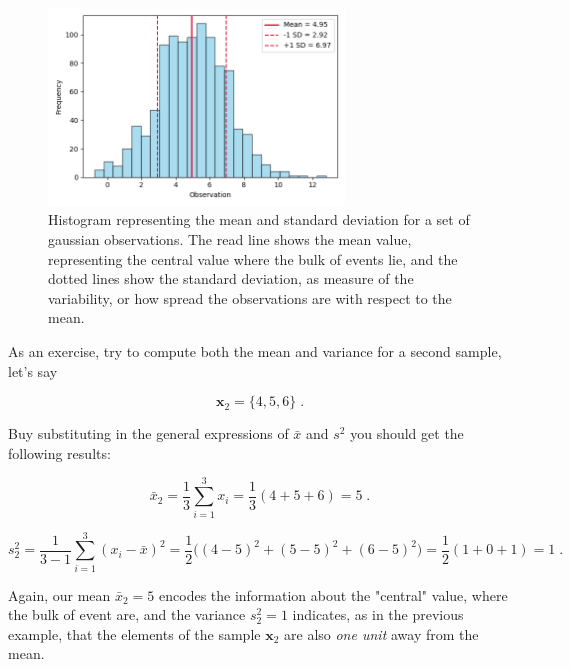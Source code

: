 \documentclass{book}
\begin{document}
\begin{figure}[ht]
    \centering
    \includegraphics[width=0.7\textwidth]{figures/chapter1/normal_hist.png}
    \caption{Histogram representing the mean and standard deviation for a set of gaussian observations. The read line shows the mean value, representing the central value where the bulk of events lie, and the dotted lines show the standard deviation, as measure of the variability, or how spread the observations are with respect to the mean.}
    \label{fig:histogram1}
\end{figure}

As an exercise, try to compute both the mean and variance for a second sample, let's say

\begin{equation}
\textbf{x}_2 = \{4, 5, 6\} \; . \nonumber
\end{equation}

Buy substituting in the general expressions of $\bar{x}$ and $s^2$ you should get the following results: 

\begin{equation}
\bar{x}_2 = \frac{1}{3} \sum_{i = 1}^{3} x_{i} = \frac{1}{3} (4 + 5 + 6) = 5 \; . \nonumber
\end{equation}

\begin{equation}
s^2_2 = \frac{1}{3 - 1} \sum_{i = 1}^{3} (x_{i} - \bar{x})^{2} = \frac{1}{2} \big((4 - 5)^{2} + (5 - 5)^{2} + (6 - 5)^{2}\big) = \frac{1}{2} (1 + 0 + 1) = 1 \; . \nonumber
\end{equation}

Again, our mean $\bar{x}_2 = 5$ encodes the information about the "central" value, where the bulk of event are, and the variance $s^2_2 = 1$ indicates, as in the previous example, that the elements of the sample $\textbf{x}_2$ are also \textit{one unit} away from the mean.\\
\end{document}
